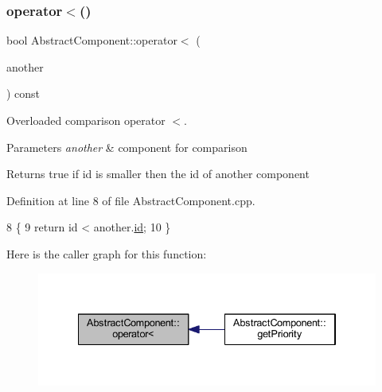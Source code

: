 \subsubsection{\texorpdfstring{operator$<$()}{operator<()}}
{\footnotesize\ttfamily bool Abstract\+Component\+::operator$<$ (\begin{DoxyParamCaption}\item[{const \hyperlink{class_abstract_component}{Abstract\+Component} \&}]{another }\end{DoxyParamCaption}) const\hspace{0.3cm}{\ttfamily [inherited]}}



Overloaded comparison operator \textquotesingle{}$<$\textquotesingle{}. 


\begin{DoxyParams}{Parameters}
{\em another} & component for comparison \\
\hline
\end{DoxyParams}
\begin{DoxyReturn}{Returns}
true if id is smaller then the id of another component 
\end{DoxyReturn}


Definition at line 8 of file Abstract\+Component.\+cpp.


\begin{DoxyCode}
8                                                                         \{
9     \textcolor{keywordflow}{return} \textcolor{keywordtype}{id} < another.\hyperlink{class_abstract_component_a9c9c548149681b1a1dd935e66ed5dd11}{id};
10 \}
\end{DoxyCode}
Here is the caller graph for this function\+:
\nopagebreak
\begin{figure}[H]
\begin{center}
\leavevmode
\includegraphics[width=334pt]{class_abstract_component_a0c2e458144111c5f599c66f168516abc_icgraph}
\end{center}
\end{figure}
\mbox{\label{class_abstract_component_a58a59a9ea6c3b4c86fb3bf98ff1eaaef}} 
